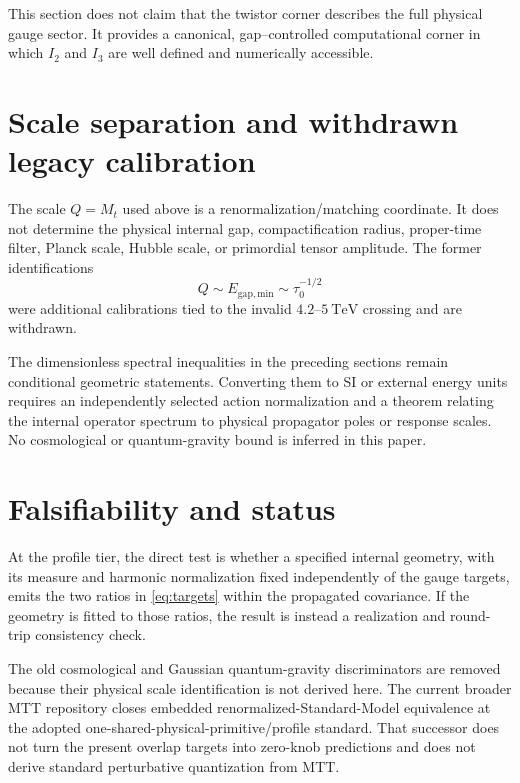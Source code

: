 \documentclass[11pt]{article}
\begin{document}
This section does not claim that the twistor corner describes the full
physical gauge sector. It provides a canonical, gap--controlled
computational corner in which $I_2$ and $I_3$ are well defined and
numerically accessible.


\section{Scale separation and withdrawn legacy calibration}

The scale $Q=M_t$ used above is a renormalization/matching coordinate.  It does
not determine the physical internal gap, compactification radius, proper-time
filter, Planck scale, Hubble scale, or primordial tensor amplitude.  The former
identifications
\[
 Q\sim E_{\mathrm{gap,min}}\sim\tau_0^{-1/2}
\]
were additional calibrations tied to the invalid $4.2$--$5~\mathrm{TeV}$
crossing and are withdrawn.

The dimensionless spectral inequalities in the preceding sections remain
conditional geometric statements.  Converting them to SI or external energy
units requires an independently selected action normalization and a theorem
relating the internal operator spectrum to physical propagator poles or
response scales.  No cosmological or quantum-gravity bound is inferred in this
paper.


\section{Falsifiability and status}

At the profile tier, the direct test is whether a specified internal geometry,
with its measure and harmonic normalization fixed independently of the gauge
targets, emits the two ratios in \eqref{eq:targets} within the propagated
covariance.  If the geometry is fitted to those ratios, the result is instead
a realization and round-trip consistency check.

The old cosmological and Gaussian quantum-gravity discriminators are removed
because their physical scale identification is not derived here.  The current
broader MTT repository closes embedded renormalized-Standard-Model equivalence
at the adopted one-shared-physical-primitive/profile standard.  That successor
does not turn the present overlap targets into zero-knob predictions and does
not derive standard perturbative quantization from MTT.
\end{document}
